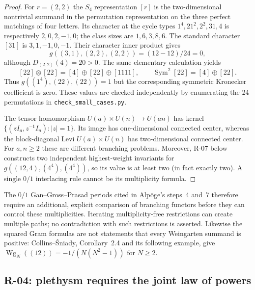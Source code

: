 \begin{proof}
For $r=(2,2)$ the $S_4$ representation $[r]$ is the two-dimensional
nontrivial summand in the permutation representation on the three
perfect matchings of four letters. Its character at the cycle types
$1^4,21^2,2^2,31,4$ is respectively $2,0,2,-1,0$; the class sizes are
$1,6,3,8,6$. The standard character $[31]$ is $3,1,-1,0,-1$.
Their character inner product gives
\[
 g((3,1),(2,2),(2,2))=(12-12)/24=0,
\]
although $D_{(2,2)}(4)=20>0$. The same elementary calculation yields
\[
 [22]\otimes[22]=[4]\oplus[22]\oplus[1111],\qquad
 \operatorname{Sym}^2[22]=[4]\oplus[22].
\]
Thus $g((1^4),(22),(22))=1$ but the corresponding symmetric Kronecker
coefficient is zero. These values are checked independently by enumerating
the 24 permutations in \texttt{check\_small\_cases.py}.

The tensor homomorphism $U(a)\times U(n)\longrightarrow U(an)$ has kernel
$\{(zI_a,z^{-1}I_n):|z|=1\}$. Its image has one-dimensional connected
center, whereas the block-diagonal Levi $U(a)\times U(n)$ has
two-dimensional connected center. For $a,n\geq2$ these are different
branching problems. Moreover, R-07 below constructs two independent
highest-weight invariants for $g((12,4),(4^4),(4^4))$, so its value is at
least two (in fact exactly two). A single $0/1$ interlacing rule cannot
be its multiplicity formula.
\end{proof}

The $0/1$ Gan--Gross--Prasad periods cited in Alp\"oge's steps~4 and~7
therefore require an additional, explicit comparison of branching
functors before they can control these multiplicities. Iterating
multiplicity-free restrictions can create multiple paths; no
contradiction with such restrictions is asserted. Likewise the squared
Gram formulas are not statements that every Weingarten summand is
positive: Collins--\'Sniady, Corollary~2.4 and its following example, give
$\operatorname{Wg}_N((12))=-1/(N(N^2-1))$ for $N\geq2$.

\subsection{R-04: plethysm requires the joint law of powers}

